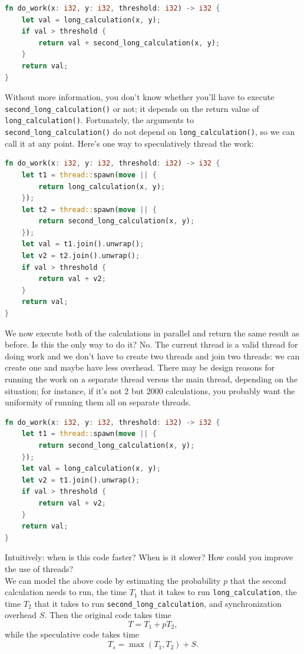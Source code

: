 \begin{lstlisting}[language=Rust]
fn do_work(x: i32, y: i32, threshold: i32) -> i32 {
    let val = long_calculation(x, y);
    if val > threshold {
        return val + second_long_calculation(x, y);
    }
    return val;
}
\end{lstlisting}
Without more information, you don't know whether you'll have to execute
{\tt second\_long\_calculation()} or not; it depends on the return value of
{\tt long\_calculation()}. Fortunately, the arguments to {\tt second\_long\_calculation()} do not
depend on {\tt long\_calculation()}, so we can call it at any point. 
Here's one way to speculatively thread the work:

\begin{lstlisting}[language=Rust]
fn do_work(x: i32, y: i32, threshold: i32) -> i32 {
    let t1 = thread::spawn(move || {
        return long_calculation(x, y);
    });
    let t2 = thread::spawn(move || {
        return second_long_calculation(x, y);
    });
    let val = t1.join().unwrap();
    let v2 = t2.join().unwrap();
    if val > threshold {
        return val + v2;
    }
    return val;
}
\end{lstlisting}
We now execute both of the calculations in parallel and return the same
result as before. Is this the only way to do it? No. The current thread is a valid thread for doing work and we don't have to create two threads and join two threads: we can create one and maybe have less overhead. There may be design reasons for running the work on a separate thread versus the main thread, depending on the situation; for instance, if it's not 2 but 2000 calculations, you probably want the uniformity of running them all on separate threads.

\begin{lstlisting}[language=Rust]
fn do_work(x: i32, y: i32, threshold: i32) -> i32 {
    let t1 = thread::spawn(move || {
        return second_long_calculation(x, y);
    });
    let val = long_calculation(x, y);
    let v2 = t1.join().unwrap();
    if val > threshold {
        return val + v2;
    }
    return val;
}
\end{lstlisting}

{\sf Intuitively: when is this code faster? When is it slower? How
  could you improve the use of threads?}\\[4em]

We can model the above code by estimating the probability $p$ that
the second calculation needs to run, the time $T_1$ that it takes
to run {\tt long\_calculation}, the time $T_2$ that it takes to run
{\tt second\_long\_calculation}, and synchronization overhead $S$.
Then the original code takes time
\[ T = T_1 + p T_2, \]
while the speculative code takes time
\[ T_s = \max(T_1, T_2) + S.\]


